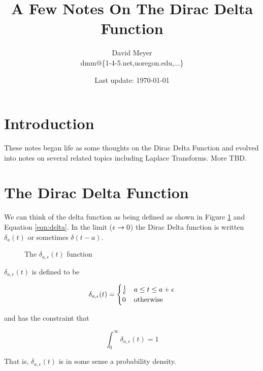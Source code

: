 \documentclass{article}
\title{A Few Notes On The Dirac Delta Function}
\author{David Meyer \\ dmm@\{1-4-5.net,uoregon.edu,...\}}
\date{Last update: \today}							%
\begin{document}
\maketitle

\section{Introduction}
These notes began life as some thoughts on the Dirac Delta Function and evolved into notes on several related topics including  Laplace Transforms. More TBD.

\section{The Dirac Delta Function}
We can think of the delta function as being  defined as shown in Figure \ref{fig:delta} and Equation \ref{eqn:delta}. In the limit ($\mathlarger{\epsilon} \to 0$) the
 Dirac Delta function is written $\delta_a(t)$ or sometimes $\delta(t - a)$. 


\begin{figure}[H]
  \centering
  \caption{The $\delta_{a,\epsilon}(t)$ function}
  \label{fig:delta}
\end{figure}

\bigskip
\noindent
$\delta_{a,\epsilon}(t)$ is defined to be

\begin{equation}
\delta_{a,\epsilon}(t) =  
 \begin{cases} 
      \frac{1}{\mathlarger {\epsilon}} & a \leq t \leq a + \epsilon \\
      0                                               & \text{otherwise}
   \end{cases}
\label{eqn:delta}
\end{equation}

\noindent
\bigskip
and has the constraint that


\begin{equation*}
  \int_{0}^{\infty} \delta_{a,\epsilon}(t) =  1
\end{equation*}

\bigskip
\bigskip
\noindent
\bigskip
That is, $\delta_{a,\epsilon}(t)$ is in some sense a probability density.
\end{document}
